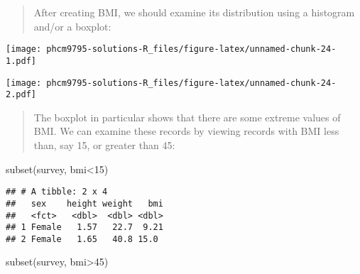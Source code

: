 \documentclass[
]{memoir}
\newenvironment{Shaded}{\begin{snugshade}}{\end{snugshade}}
\newcommand{\AttributeTok}[1]{\textcolor[rgb]{0.77,0.63,0.00}{#1}}
\newcommand{\DecValTok}[1]{\textcolor[rgb]{0.00,0.00,0.81}{#1}}
\newcommand{\FunctionTok}[1]{\textcolor[rgb]{0.00,0.00,0.00}{#1}}
\newcommand{\NormalTok}[1]{#1}
\newcommand{\SpecialCharTok}[1]{\textcolor[rgb]{0.00,0.00,0.00}{#1}}
\newcommand{\StringTok}[1]{\textcolor[rgb]{0.31,0.60,0.02}{#1}}
\begin{document}
\begin{quote}
After creating BMI, we should examine its distribution using a histogram and/or a boxplot:
\end{quote}

\begin{Shaded}
\end{Shaded}

\texttt{[image: phcm9795-solutions-R\_files/figure-latex/unnamed-chunk-24-1.pdf]}

\begin{Shaded}
\end{Shaded}

\texttt{[image: phcm9795-solutions-R\_files/figure-latex/unnamed-chunk-24-2.pdf]}

\begin{quote}
The boxplot in particular shows that there are some extreme values of BMI. We can examine these records by viewing records with BMI less than, say 15, or greater than 45:
\end{quote}

\begin{Shaded}
\begin{Highlighting}[]
\FunctionTok{subset}\NormalTok{(survey, bmi}\SpecialCharTok{\textless{}}\DecValTok{15}\NormalTok{)}
\end{Highlighting}
\end{Shaded}

\begin{verbatim}
## # A tibble: 2 x 4
##   sex    height weight   bmi
##   <fct>   <dbl>  <dbl> <dbl>
## 1 Female   1.57   22.7  9.21
## 2 Female   1.65   40.8 15.0
\end{verbatim}

\begin{Shaded}
\begin{Highlighting}[]
\FunctionTok{subset}\NormalTok{(survey, bmi}\SpecialCharTok{\textgreater{}}\DecValTok{45}\NormalTok{)}
\end{Highlighting}
\end{Shaded}
\end{document}
